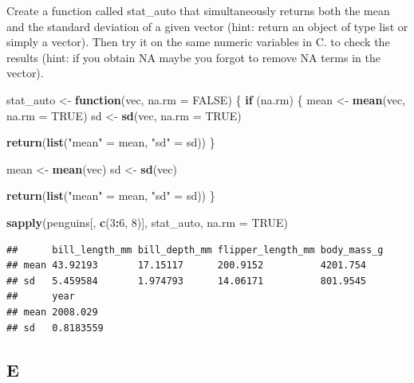 \documentclass[
]{article}
\newenvironment{Shaded}{\begin{snugshade}}{\end{snugshade}}
\newcommand{\ControlFlowTok}[1]{\textcolor[rgb]{0.13,0.29,0.53}{\textbf{#1}}}
\newcommand{\DataTypeTok}[1]{\textcolor[rgb]{0.13,0.29,0.53}{#1}}
\newcommand{\DecValTok}[1]{\textcolor[rgb]{0.00,0.00,0.81}{#1}}
\newcommand{\KeywordTok}[1]{\textcolor[rgb]{0.13,0.29,0.53}{\textbf{#1}}}
\newcommand{\NormalTok}[1]{#1}
\newcommand{\OperatorTok}[1]{\textcolor[rgb]{0.81,0.36,0.00}{\textbf{#1}}}
\newcommand{\OtherTok}[1]{\textcolor[rgb]{0.56,0.35,0.01}{#1}}
\newcommand{\StringTok}[1]{\textcolor[rgb]{0.31,0.60,0.02}{#1}}
\begin{document}
Create a function called stat\_auto that simultaneously returns both the
mean and the standard deviation of a given vector (hint: return an
object of type list or simply a vector). Then try it on the same numeric
variables in C. to check the results (hint: if you obtain NA maybe you
forgot to remove NA terms in the vector).

\begin{Shaded}
\begin{Highlighting}[]
\NormalTok{stat\_auto \textless{}{-}}\StringTok{ }\ControlFlowTok{function}\NormalTok{(vec, }\DataTypeTok{na.rm =} \OtherTok{FALSE}\NormalTok{) \{}
  \ControlFlowTok{if}\NormalTok{ (na.rm) \{}
\NormalTok{    mean \textless{}{-}}\StringTok{ }\KeywordTok{mean}\NormalTok{(vec, }\DataTypeTok{na.rm =} \OtherTok{TRUE}\NormalTok{)}
\NormalTok{    sd \textless{}{-}}\StringTok{ }\KeywordTok{sd}\NormalTok{(vec, }\DataTypeTok{na.rm =} \OtherTok{TRUE}\NormalTok{)}

    \KeywordTok{return}\NormalTok{(}\KeywordTok{list}\NormalTok{(}\StringTok{"mean"}\NormalTok{ =}\StringTok{ }\NormalTok{mean, }\StringTok{"sd"}\NormalTok{ =}\StringTok{ }\NormalTok{sd))}
\NormalTok{  \}}

\NormalTok{  mean \textless{}{-}}\StringTok{ }\KeywordTok{mean}\NormalTok{(vec)}
\NormalTok{  sd \textless{}{-}}\StringTok{ }\KeywordTok{sd}\NormalTok{(vec)}

  \KeywordTok{return}\NormalTok{(}\KeywordTok{list}\NormalTok{(}\StringTok{"mean"}\NormalTok{ =}\StringTok{ }\NormalTok{mean, }\StringTok{"sd"}\NormalTok{ =}\StringTok{ }\NormalTok{sd))}
\NormalTok{\}}

\KeywordTok{sapply}\NormalTok{(penguins[, }\KeywordTok{c}\NormalTok{(}\DecValTok{3}\OperatorTok{:}\DecValTok{6}\NormalTok{, }\DecValTok{8}\NormalTok{)], stat\_auto, }\DataTypeTok{na.rm =} \OtherTok{TRUE}\NormalTok{)}
\end{Highlighting}
\end{Shaded}

\begin{verbatim}
##      bill_length_mm bill_depth_mm flipper_length_mm body_mass_g
## mean 43.92193       17.15117      200.9152          4201.754   
## sd   5.459584       1.974793      14.06171          801.9545   
##      year     
## mean 2008.029 
## sd   0.8183559
\end{verbatim}

\hypertarget{e}{%
\subsection{E}\label{e}}
\end{document}
